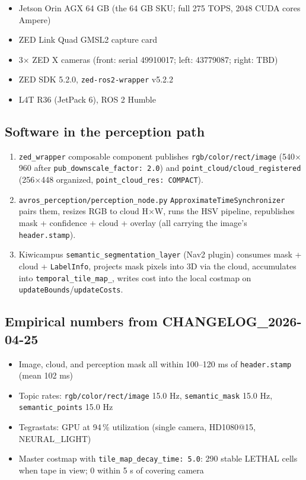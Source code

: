 \documentclass[11pt]{article}
\begin{document}
\begin{itemize}[leftmargin=2em,nosep]
\item Jetson Orin AGX 64 GB (the 64 GB SKU; full 275 TOPS, 2048 CUDA cores Ampere)
\item ZED Link Quad GMSL2 capture card
\item 3$\times$ ZED X cameras (front: serial 49910017; left: 43779087; right: TBD)
\item ZED SDK 5.2.0, \texttt{zed-ros2-wrapper} v5.2.2
\item L4T R36 (JetPack 6), ROS 2 Humble
\end{itemize}

\subsection{Software in the perception path}

\begin{enumerate}[leftmargin=2em,nosep]
\item \texttt{zed\_wrapper} composable component publishes
  \texttt{rgb/color/rect/image} (540$\times$960 after \texttt{pub\_downscale\_factor: 2.0})
  and \texttt{point\_cloud/cloud\_registered} (256$\times$448 organized,
  \texttt{point\_cloud\_res: COMPACT}).
\item \texttt{avros\_perception/perception\_node.py} \texttt{ApproximateTimeSynchronizer}
  pairs them, resizes RGB to cloud H$\times$W, runs the HSV pipeline,
  republishes mask + confidence + cloud + overlay (all carrying the image's
  \texttt{header.stamp}).
\item Kiwicampus \texttt{semantic\_segmentation\_layer} (Nav2 plugin)
  consumes mask + cloud + \texttt{LabelInfo}, projects mask pixels into 3D
  via the cloud, accumulates into \texttt{temporal\_tile\_map\_}, writes
  cost into the local costmap on \texttt{updateBounds}/\texttt{updateCosts}.
\end{enumerate}

\subsection{Empirical numbers from CHANGELOG\_2026-04-25}

\begin{itemize}[leftmargin=2em,nosep]
\item Image, cloud, and perception mask all within 100--120 ms of \texttt{header.stamp} (mean 102 ms)
\item Topic rates: \texttt{rgb/color/rect/image} 15.0 Hz, \texttt{semantic\_mask} 15.0 Hz, \texttt{semantic\_points} 15.0 Hz
\item Tegrastats: GPU at 94\,\% utilization (single camera, HD1080@15, NEURAL\_LIGHT)
\item Master costmap with \texttt{tile\_map\_decay\_time: 5.0}: 290 stable LETHAL cells when tape in view; 0 within 5 s of covering camera
\end{itemize}
\end{document}
